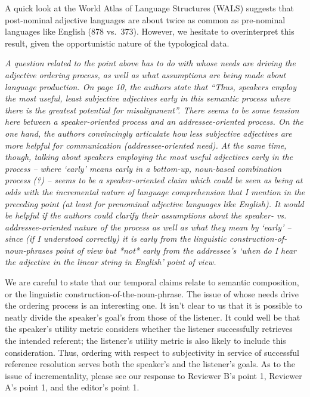 \documentclass[12pt]{article}
\newcommand{\gcs}[1]{\textcolor{blue}{[gcs: #1]}}
\begin{document}
A quick look at the World Atlas of Language Structures (WALS) suggests that post-nominal adjective languages are about twice as common as pre-nominal languages like English (878 vs.~373). However, we hesitate to overinterpret this result, given the opportunistic nature of the typological data.

\item \emph{A question related to the point above has to do with whose needs are driving the adjective ordering process, as well as what assumptions are being made
about language production. On page 10, the authors state that ``Thus,
speakers employ the most useful, least subjective adjectives early in this
semantic process where there is the greatest potential for misalignment''.
There seems to be some tension here between a speaker-oriented process and
an addressee-oriented process. On the one hand, the authors convincingly
articulate how less subjective adjectives are more helpful for communication
(addressee-oriented need). At the same time, though, talking about speakers
employing the most useful adjectives early in the process – where
`early' means early in a bottom-up, noun-based combination process (?)
– seems to be a speaker-oriented claim which could be seen as being at
odds with the incremental nature of language comprehension that I mention in
the preceding point (at least for prenominal adjective languages like
English).   It would be helpful if the authors could clarify their
assumptions about the speaker- vs. addressee-oriented nature of the process
as well as what they mean by `early'  – since (if I understood
correctly) it is early from the linguistic construction-of-noun-phrases
point of view but *not* early from the addressee's `when do I hear the
adjective in the linear string in English' point of view.}

We are careful to state that our temporal claims relate to semantic composition, or the linguistic construction-of-the-noun-phrase. The issue of whose needs drive the ordering process is an interesting one. It isn't clear to us that it is possible to neatly divide the speaker's goal's from those of the listener. It could well be that the speaker's utility metric considers whether the listener successfully retrieves the intended referent; the listener's utility metric is also likely to include this consideration. Thus, ordering with respect to subjectivity in service of successful reference resolution serves both the speaker's and the listener's goals. %
As to the issue of incrementality, please see our response to Reviewer B's point 1, Reviewer A's point 1, and the editor's point 1. 
\end{document}
